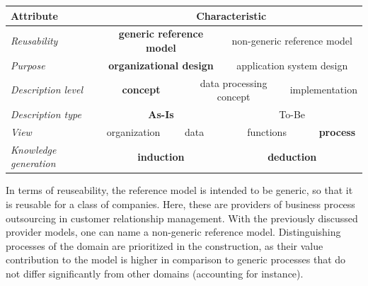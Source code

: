 \begin{table}[caption={Reference Model Requirements }, label=tab:morph]
	\centering
		\begin{tabular}{ 
				p{3.1cm}  
			p{2cm} p{2cm} p{2cm} p{2cm} p{2cm} p{2cm} p{2cm} p{2cm} p{2cm} p{2cm} p{2cm} p{2cm}    }
			Attribute                                   & \multicolumn{12}{c}{ Characteristic }                                                                                                                  \\ \hline
			\multicolumn{1}{|l|}{\textit{Reusability}}          & \multicolumn{6}{c|}{\textbf{generic reference model}}                       & \multicolumn{6}{c|}{non-generic reference model}                  \\ \hline
			\multicolumn{1}{|l|}{\textit{Purpose}}              & \multicolumn{6}{c|}{\textbf{organizational design}}                         & \multicolumn{6}{c|}{application system design}                    \\ \hline
			\multicolumn{1}{|l|}{\textit{Description level}}    & \multicolumn{4}{c|}{\textbf{concept}}                & \multicolumn{4}{c|}{data processing concept} & \multicolumn{4}{c|}{implementation}       \\ \hline
			\multicolumn{1}{|l|}{\textit{Description type}}     & \multicolumn{6}{c|}{\textbf{As-Is}}                  & \multicolumn{6}{c|}{To-Be}                             \\ \hline
			\multicolumn{1}{|l|}{\textit{View}}                 & \multicolumn{3}{c|}{organization} & \multicolumn{3}{c|}{data}    & \multicolumn{3}{c|}{functions}   & \multicolumn{3}{c|}{\textbf{process}} \\ \hline
			\multicolumn{1}{|l|}{\textit{Knowledge generation}} & \multicolumn{6}{c|}{\textbf{induction}}                                     & \multicolumn{6}{c|}{\textbf{deduction}}                                    \\ \hline 
		
			
	\end{tabular}
\end{table}

In terms of reuseability, the reference model is intended to be generic, so that it is reusable for a class of companies. Here, these are providers of business process outsourcing in customer relationship management. With the previously discussed provider models, one can name a non-generic reference model. Distinguishing processes of the domain are prioritized in the construction, as their value contribution to the model is higher in comparison to generic processes that do not differ significantly from other domains (accounting for instance).  

